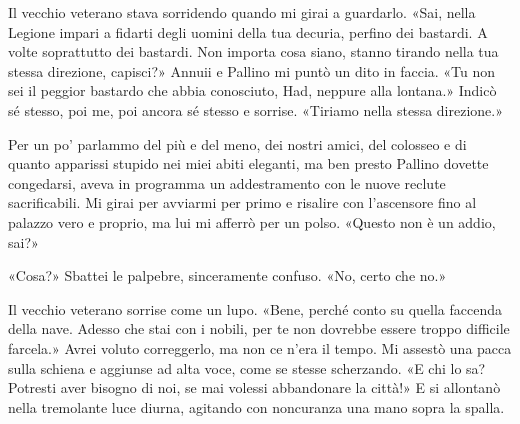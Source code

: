Il vecchio veterano stava sorridendo quando mi girai a guardarlo. «Sai,
nella Legione impari a fidarti degli uomini della tua decuria, perfino
dei bastardi. A volte soprattutto dei bastardi. Non importa cosa siano,
stanno tirando nella tua stessa direzione, capisci?» Annuii e Pallino mi
puntò un dito in faccia. «Tu non sei il peggior bastardo che abbia
conosciuto, Had, neppure alla {lontana}.» Indicò sé stesso, poi me, poi
ancora sé stesso e sorrise. «Tiriamo nella stessa direzione.»

Per un po' parlammo del più e del meno, dei nostri amici, del colosseo e
di quanto apparissi stupido nei miei abiti eleganti, ma ben presto
Pallino dovette congedarsi, aveva in programma un addestramento con le
nuove reclute sacrificabili. Mi girai per avviarmi per primo e risalire
con l'ascensore fino al palazzo vero e proprio, ma lui mi afferrò per un
polso. «Questo non è un addio, sai?»

«Cosa?» Sbattei le palpebre, sinceramente confuso. «No, certo che no.»

Il vecchio veterano sorrise come un lupo. «Bene, perché conto su quella
faccenda della nave. Adesso che stai con i nobili, per te non dovrebbe
essere troppo difficile farcela.» Avrei voluto correggerlo, ma non ce
n'era il tempo. Mi assestò una pacca sulla schiena e aggiunse ad alta
voce, come se stesse scherzando. «E chi lo sa? Potresti aver bisogno di
noi, se mai volessi abbandonare la città!» E si allontanò nella
tremolante luce diurna, agitando con noncuranza una mano sopra la
spalla.


